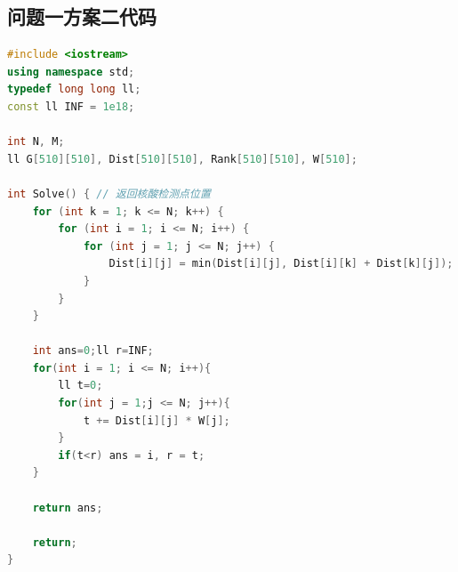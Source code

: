 \documentclass{cumcmthesis}
\begin{document}
\begin{appendices}
\section{问题一方案二代码}

\begin{lstlisting}[language=cpp]
#include <iostream>
using namespace std;
typedef long long ll;
const ll INF = 1e18;

int N, M;
ll G[510][510], Dist[510][510], Rank[510][510], W[510];

int Solve() { // 返回核酸检测点位置
    for (int k = 1; k <= N; k++) {
        for (int i = 1; i <= N; i++) {
            for (int j = 1; j <= N; j++) {
                Dist[i][j] = min(Dist[i][j], Dist[i][k] + Dist[k][j]);
            }
        }
    }

    int ans=0;ll r=INF;
    for(int i = 1; i <= N; i++){
        ll t=0;
        for(int j = 1;j <= N; j++){
            t += Dist[i][j] * W[j];
        }
        if(t<r) ans = i, r = t;
    }

    return ans;
    
    return;
}
\end{lstlisting}

\end{appendices}
\end{document}
